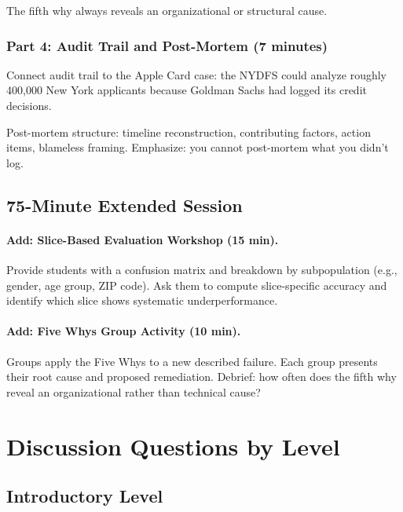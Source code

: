 The fifth why always reveals an organizational or structural cause.

\subsubsection{Part 4: Audit Trail and Post-Mortem (7 minutes)}

Connect audit trail to the Apple Card case: the NYDFS could analyze roughly 400,000 New York applicants because Goldman Sachs had logged its credit decisions.

Post-mortem structure: timeline reconstruction, contributing factors, action items, blameless framing. Emphasize: you cannot post-mortem what you didn't log.

\subsection{75-Minute Extended Session}

\paragraph{Add: Slice-Based Evaluation Workshop (15 min).}
Provide students with a confusion matrix and breakdown by subpopulation (e.g., gender, age group, ZIP code). Ask them to compute slice-specific accuracy and identify which slice shows systematic underperformance.

\paragraph{Add: Five Whys Group Activity (10 min).}
Groups apply the Five Whys to a new described failure. Each group presents their root cause and proposed remediation. Debrief: how often does the fifth why reveal an organizational rather than technical cause?

\section{Discussion Questions by Level}

\subsection{Introductory Level}

